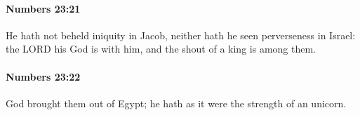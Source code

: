 		\paragraph{Numbers 23:21} %
			\label{NUMBERS-23-21}

			He hath not beheld iniquity in Jacob, neither hath he seen perverseness in Israel: the LORD his God is with him, and the shout of a king is among them.


		\paragraph{Numbers 23:22} %
			\label{NUMBERS-23-22}

			God brought them out of Egypt; he hath as it were the strength of an unicorn.


